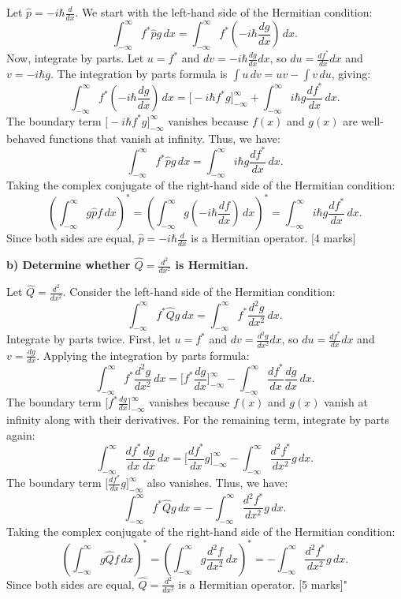 Let $\hat{p} = -i\hbar \frac{d}{dx}$. We start with the left-hand side of the Hermitian condition:
\[
\int_{-\infty}^\infty f^* \hat{p} g \, dx = \int_{-\infty}^\infty f^* \left(-i\hbar \frac{d g}{dx}\right) \, dx.
\]
Now, integrate by parts. Let $u = f^*$ and $dv = -i\hbar \frac{d g}{dx} dx$, so $du = \frac{df^*}{dx} dx$ and $v = -i\hbar g$. The integration by parts formula is $\int u \, dv = uv - \int v \, du$, giving:
\[
\int_{-\infty}^\infty f^* \left(-i\hbar \frac{d g}{dx}\right) \, dx = \Big[ -i\hbar f^* g \Big]_{-\infty}^\infty + \int_{-\infty}^\infty i\hbar g \frac{d f^*}{dx} \, dx.
\]
The boundary term $\Big[ -i\hbar f^* g \Big]_{-\infty}^\infty$ vanishes because $f(x)$ and $g(x)$ are well-behaved functions that vanish at infinity. Thus, we have:
\[
\int_{-\infty}^\infty f^* \hat{p} g \, dx = \int_{-\infty}^\infty i\hbar g \frac{d f^*}{dx} \, dx.
\]
Taking the complex conjugate of the right-hand side of the Hermitian condition:
\[
\left(\int_{-\infty}^\infty g \hat{p} f \, dx \right)^* = \left(\int_{-\infty}^\infty g \left(-i\hbar \frac{d f}{dx}\right) \, dx \right)^* = \int_{-\infty}^\infty i\hbar g \frac{d f^*}{dx} \, dx.
\]
Since both sides are equal, $\hat{p} = -i\hbar \frac{d}{dx}$ is a Hermitian operator. \hfill [4 marks]

\textbf{b) Determine whether $\hat{Q} = \frac{d^2}{dx^2}$ is Hermitian.}

Let $\hat{Q} = \frac{d^2}{dx^2}$. Consider the left-hand side of the Hermitian condition:
\[
\int_{-\infty}^\infty f^* \hat{Q} g \, dx = \int_{-\infty}^\infty f^* \frac{d^2 g}{dx^2} \, dx.
\]
Integrate by parts twice. First, let $u = f^*$ and $dv = \frac{d^2 g}{dx^2} dx$, so $du = \frac{df^*}{dx} dx$ and $v = \frac{dg}{dx}$. Applying the integration by parts formula:
\[
\int_{-\infty}^\infty f^* \frac{d^2 g}{dx^2} \, dx = \Big[ f^* \frac{dg}{dx} \Big]_{-\infty}^\infty - \int_{-\infty}^\infty \frac{df^*}{dx} \frac{dg}{dx} \, dx.
\]
The boundary term $\Big[ f^* \frac{dg}{dx} \Big]_{-\infty}^\infty$ vanishes because $f(x)$ and $g(x)$ vanish at infinity along with their derivatives. For the remaining term, integrate by parts again:
\[
\int_{-\infty}^\infty \frac{df^*}{dx} \frac{dg}{dx} \, dx = \Big[ \frac{df^*}{dx} g \Big]_{-\infty}^\infty - \int_{-\infty}^\infty \frac{d^2 f^*}{dx^2} g \, dx.
\]
The boundary term $\Big[ \frac{df^*}{dx} g \Big]_{-\infty}^\infty$ also vanishes. Thus, we have:
\[
\int_{-\infty}^\infty f^* \hat{Q} g \, dx = -\int_{-\infty}^\infty \frac{d^2 f^*}{dx^2} g \, dx.
\]
Taking the complex conjugate of the right-hand side of the Hermitian condition:
\[
\left(\int_{-\infty}^\infty g \hat{Q} f \, dx \right)^* = \left(\int_{-\infty}^\infty g \frac{d^2 f}{dx^2} \, dx \right)^* = -\int_{-\infty}^\infty \frac{d^2 f^*}{dx^2} g \, dx.
\]
Since both sides are equal, $\hat{Q} = \frac{d^2}{dx^2}$ is a Hermitian operator. \hfill [5 marks]"

